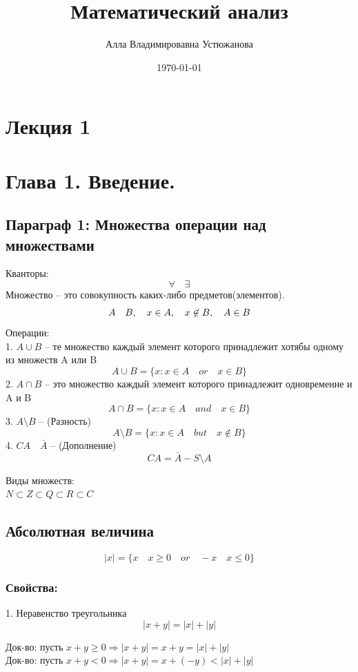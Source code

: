 \documentclass[a4paper, 12pt]{article}
\title{Математический анализ}
\author{Алла Владимировавна Устюжанова}
\date{\today}
\begin{document}
\sffamily
\maketitle
\section*{Лекция 1}

\section{Глава 1. Введение. }
\subsection{Параграф 1: Множества операции над множествами}
Кванторы:
\[
	\forall \quad \exists
\]
Множество -- это совокупность каких-либо предметов(элементов).
\[
	A \quad B , \\\quad
	x \in A,\\ \quad
	x \not\in B,	\\\quad
	A \in B\\
\]
Операции: \\
1. $ A \cup B $ -- те множество каждый элемент которого принадлежит хотябы одному из множеств A или B \[
	A \cup B = \{x:x \in A \quad or \quad x \in B\}	
\]
2. $ A \cap B $ -- это множество каждый элемент которого принадлежит одновременне и A и B \[
	 A \cap B = \{x: x\in A \quad and \quad x \in B\}	
\]
3. $ A \setminus B $ -- (Разность)\[
	A \setminus B = \{x: x\in A \quad but \quad x\not\in B\}	
\]
4. $ CA \quad\bar{A} $ -- (Дополнение) \[
	CA = \bar{A} - S\setminus A	
\]


Виды множеств:\\
$ N \subset Z \subset Q \subset R \subset C $\\

\subsection{Абсолютная величина}
\[
	|x| = \{x \quad x \geq 0 \quad or \quad -x \quad x\leq 0\}	
\]
\subsubsection*{Свойства:}
1. Неравенство треугольника \[
 |x+y| = |x| + |y|	
\]
\begin{mdframed}[backgroundcolor=blue!20] 
       Док-во: пусть $  x+y \geq 0\Rightarrow |x+y| = x+y=|x|+|y|$\\
       Док-во: пусть $  x+y < 0\Rightarrow |x+y| = x+(-y)<|x|+|y|$
    \end{mdframed}
\end{document}
